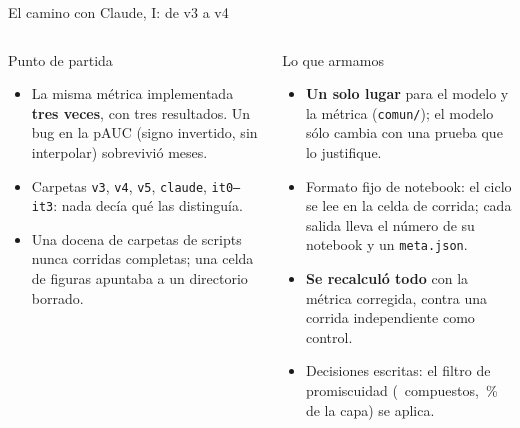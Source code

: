 \documentclass[aspectratio=169,11pt]{beamer}
\begin{document}
\begin{frame}{El camino con Claude, I: de v3 a v4}
\begin{columns}[T]
\begin{block}{Punto de partida}
\begin{itemize}\setlength\itemsep{.35em}\small
\item La misma métrica implementada \textbf{tres veces}, con tres resultados.
  Un bug en la pAUC (signo invertido, sin interpolar) sobrevivió meses.
\item Carpetas \texttt{v3}, \texttt{v4}, \texttt{v5}, \texttt{claude},
  \texttt{it0–it3}: nada decía qué las distinguía.
\item Una docena de carpetas de scripts nunca corridas completas; una celda de
  figuras apuntaba a un directorio borrado.
\end{itemize}
\end{block}
\begin{block}{Lo que armamos}
\begin{itemize}\setlength\itemsep{.35em}\small
\item \textbf{Un solo lugar} para el modelo y la métrica (\texttt{comun/}); el
  modelo sólo cambia con una prueba que lo justifique.
\item Formato fijo de notebook: el ciclo se lee en la celda de corrida; cada
  salida lleva el número de su notebook y un \texttt{meta.json}.
\item \textbf{Se recalculó todo} con la métrica corregida, contra una corrida
  independiente como control.
\item Decisiones escritas: el filtro de promiscuidad
  (\PromiscuosVcuatro\ compuestos, \PctAristasVcuatro\,\% de la capa) se aplica.
\end{itemize}
\end{block}
\end{columns}
\end{frame}
\end{document}
